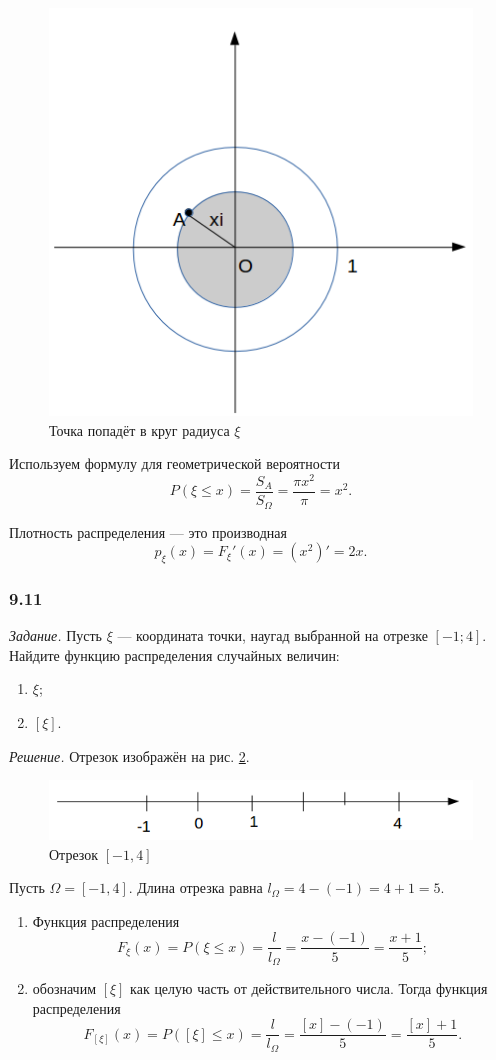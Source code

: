 \begin{figure}[h!]
  \centering
  \includegraphics[width=.4\textwidth]{./pictures/9_10.png}
  \caption{Точка попадёт в круг радиуса $ \xi $}
  \label{fig:910}
\end{figure}

Используем формулу для геометрической вероятности
$$P \left( \xi \leq x \right) =
\frac{S_{A}}{S_{ \Omega }} =
\frac{ \pi x^2}{ \pi } =
x^2.$$

Плотность распределения --- это производная
$$p_{ \xi } \left( x \right) =
F_{ \xi }' \left( x \right) =
\left( x^2 \right)' =
2x.$$

\subsubsection*{9.11}

\textit{Задание.} Пусть $ \xi $ --- координата точки, наугад выбранной на отрезке $ \left[ -1; 4 \right] $.
Найдите функцию распределения случайных величин:
\begin{enumerate}[label=\alph*)]
\item $ \xi $;
\item $ \left[ \xi \right] $. 
\end{enumerate}

\textit{Решение.} Отрезок изображён на рис. \ref{fig:911}.

\begin{figure}[h!]
  \centering
  \includegraphics[width=.4\textwidth]{./pictures/9_11.png}
  \caption{Отрезок $ \left[ -1, 4 \right] $}
  \label{fig:911}
\end{figure}

Пусть $ \Omega = \left[ -1, 4 \right] $.
Длина отрезка равна $l_{ \Omega } = 4 - \left( -1 \right) = 4+1 = 5$.

\begin{enumerate}[label=\alph*)]
\item Функция распределения
$$F_{ \xi} \left( x \right) =
P \left( \xi \leq x \right) =
\frac{l}{l_{ \Omega }} =
\frac{x- \left( -1 \right) }{5} =
\frac{x+1}{5};$$
\item обозначим $ \left[ \xi \right] $ как целую часть от действительного числа.
Тогда функция распределения
$$F_{ \left[ \xi \right] } \left( x \right) =
P \left( \left[ \xi \right] \leq x \right) =
\frac{l}{l_{ \Omega }} =
\frac{ \left[ x \right] - \left( -1 \right) }{5} =
\frac{ \left[ x \right] +1}{5}.$$
\end{enumerate}

